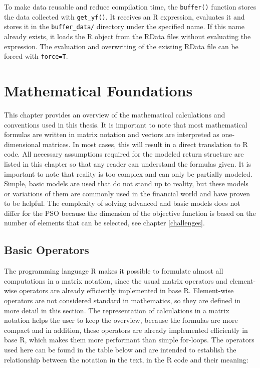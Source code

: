 \documentclass[
  oneside, a4paper, 12pt, openany]{book}
\theoremstyle{definition}
\theoremstyle{definition}
\theoremstyle{definition}
\theoremstyle{definition}
\theoremstyle{remark}
\begin{document}
To make data reusable and reduce compilation time, the \texttt{buffer()} function stores the data collected with \texttt{get\_yf()}. It receives an R expression, evaluates it and stores it in the \texttt{buffer\_data/} directory under the specified name. If this name already exists, it loads the R object from the RData files without evaluating the expression. The evaluation and overwriting of the existing RData file can be forced with \texttt{force=T}.

\hypertarget{mathfundations}{%
\chapter{Mathematical Foundations}\label{mathfundations}}

This chapter provides an overview of the mathematical calculations and conventions used in this thesis. It is important to note that most mathematical formulas are written in matrix notation and vectors are interpreted as one-dimensional matrices. In most cases, this will result in a direct translation to R code. All necessary assumptions required for the modeled return structure are listed in this chapter so that any reader can understand the formulas given. It is important to note that reality is too complex and can only be partially modeled. Simple, basic models are used that do not stand up to reality, but these models or variations of them are commonly used in the financial world and have proven to be helpful. The complexity of solving advanced and basic models does not differ for the PSO because the dimension of the objective function is based on the number of elements that can be selected, see chapter \ref{challenges}.

\hypertarget{basic-operators}{%
\section{Basic Operators}\label{basic-operators}}

The programming language R makes it possible to formulate almost all computations in a matrix notation, since the usual matrix operators and element-wise operators are already efficiently implemented in base R. Element-wise operators are not considered standard in mathematics, so they are defined in more detail in this section. The representation of calculations in a matrix notation helps the user to keep the overview, because the formulas are more compact and in addition, these operators are already implemented efficiently in base R, which makes them more performant than simple for-loops. The operators used here can be found in the table below and are intended to establish the relationship between the notation in the text, in the R code and their meaning:
\end{document}
